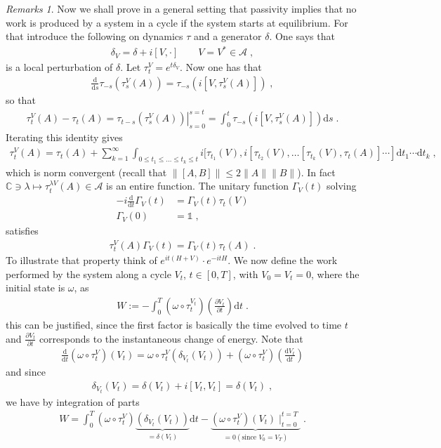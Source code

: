 \documentclass[
a4paper, %
11pt, %
onecolumn, %
openany, %
]{memoir}
\theoremstyle{definition}
\theoremstyle{remark}
\newtheorem{remarks}[definition]{Remarks}
\theoremstyle{plain}
\begin{document}
\begin{remarks}
Now we shall prove in a general setting that passivity implies that no work is produced by a system in a cycle if the system starts at equilibrium. For that introduce the following on dynamics $\tau$ and a generator $\delta$. One says that \begin{align}
\delta_V=\delta + i[V,\cdot] \qquad V=V^*\in\mathcal{A}\; ,
\end{align}
is a local perturbation of $\delta$. Let $\tau_t^V=e^{t\delta_V}$. Now one has that \begin{align}
\frac{\mathrm{d}}{\mathrm{d}s}\tau_{-s}(\tau_s^V(A))=\tau_{-s}(i[V,\tau_s^V(A)])\; ,
\end{align}
so that \begin{align}
\left.\tau_t^V(A)-\tau_t(A)=\tau_{t-s}(\tau_s^V(A))\right|_{s=0}^{s=t}=\int_0^t\tau_{-s}(i[V,\tau_s^V(A)])\mathrm{d}s\; .
\end{align}
Iterating this identity gives \begin{align}
\tau_t^V(A)=\tau_t(A)+\sum_{k=1}^{\infty}\int_{{0\leq t_1\leq \ldots\leq t_k\leq t}} i[\tau_{t_1}(V),i[\tau_{t_2}(V),\ldots [\tau_{t_k}(V),\tau_t(A)]\cdots ]\mathrm{d}t_1\cdots \mathrm{d}t_k\; ,
\end{align}
which is norm convergent (recall that $\|[A,B]\|\leq 2\| A \| \| B\| $). In fact $\mathbb{C}\ni \lambda \mapsto \tau_t^{\lambda V}(A)\in\mathcal{A}$ is an entire function. The unitary function $\Gamma_V(t)$ solving \begin{align}
-i\frac{\mathrm{d}}{\mathrm{d}t}\Gamma_V(t)&=\Gamma_V(t)\tau_t(V)\\
\Gamma_V(0)&=\mathds{1}\;,
\end{align}
satisfies \begin{align}
\tau_t^V(A)\Gamma_V(t)=\Gamma_V(t)\tau_t(A)\; .
\end{align}
To illustrate that property think of $e^{it(H+V)}\cdot e^{-itH}$. We now define the work performed by the system along a cycle $V_t$, $t\in[0,T]$, with $V_0=V_t=0$, where the initial state is $\omega$, as \begin{align}
W:=-\int_0^T(\omega\circ \tau_t^{V_t})\left(\frac{\partial V_t}{\partial t}\right)\mathrm{d}t\; .
\end{align}
this can be justified, since the first factor is basically the time evolved to time $t$ and $\frac{\partial V_t}{\partial t}$ corresponds to the instantaneous change of energy. Note that \begin{align}
\frac{\mathrm{d}}{\mathrm{d}t}(\omega\circ \tau_t^V)(V_t)=\omega\circ \tau_t^V(\delta_{V_t}(V_t))+(\omega\circ \tau_t^V)\left(\frac{\mathrm{d}V_t}{\mathrm{d}t}\right)
\end{align}
and since \begin{align}
\delta_{V_t}(V_t)=\delta(V_t)+i[V_t,V_t]=\delta(V_t)\; ,
\end{align}
we have by integration of parts \begin{align}
W=\int_0^T(\omega\circ \tau_t^V)\underbrace{(\delta_{V_t}(V_t))}_{=\delta(V_t)}\mathrm{d}t-\underbrace{(\omega\circ\tau_t^V)(V_t)\mid_{t=0}^{t=T}}_{=0 (\text{since } V_0=V_T)}\;.
\end{align}
\end{remarks}
\end{document}
